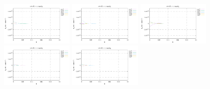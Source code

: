 \noindent
\includegraphics[width=3.5cm]{python_codes/fieldstone_152/RESULTS/exp1/err_64_m2}
\includegraphics[width=3.5cm]{python_codes/fieldstone_152/RESULTS/exp1/err_64_m3}
\includegraphics[width=3.5cm]{python_codes/fieldstone_152/RESULTS/exp1/err_64_m4}
\includegraphics[width=3.5cm]{python_codes/fieldstone_152/RESULTS/exp1/err_64_m5}
\includegraphics[width=3.5cm]{python_codes/fieldstone_152/RESULTS/exp1/err_64_m6}

